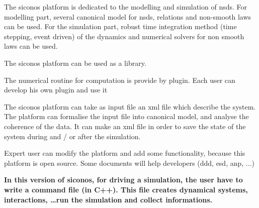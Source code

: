 The \ac{siconos} platform is dedicated to the modelling and simulation of \ac{nsds}. For modelling part, several canonical model for \ac{nsds}, relations and non-smooth laws can be used. For the simulation part, robust time integration method (time stepping, event driven) of the dynamics and numerical solvers for non smooth laws can be used.

The \ac{siconos} platform can be used as a library.

The numerical routine for computation is provide by plugin. Each user can develop his own plugin and use it

The \ac{siconos} platform can take as input file an \ac{xml} file which describe the system. The platform can formalise the input file into canonical model, and analyse the coherence of the data. It can make an \ac{xml} file in order to save the state of the system during and / or after the simulation.

Expert user can modify the platform and add some functionality, because this platform is open source. Some documents will help developers (\ac{ddd}, \ac{esd}, \ac{anp}, ...)

\textbf{
In this version of \ac{siconos}, for driving a simulation, the user have to write a command file (in C++). This file creates dynamical systems, interactions, \dots run the simulation and collect informations.
}
